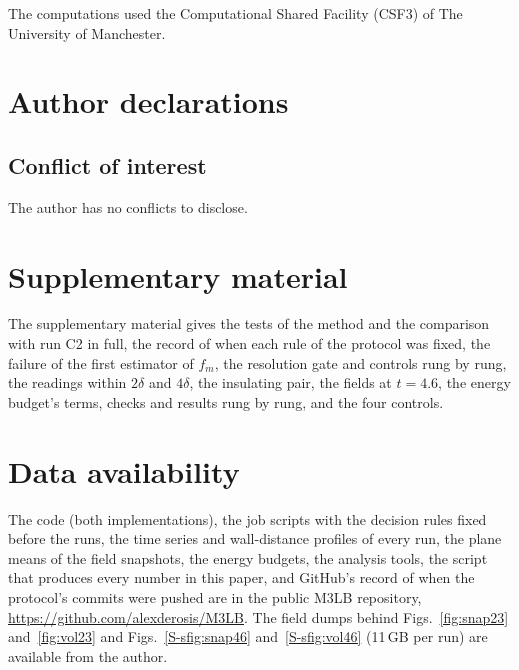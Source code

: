 \documentclass[aip,pop,reprint,amsmath,amssymb,superscriptaddress,floatfix]{revtex4-2}
\begin{document}
\begin{acknowledgments}
The computations used the Computational Shared Facility (CSF3) of The University of
Manchester.
\end{acknowledgments}

\section*{Author declarations}
\subsection*{Conflict of interest}
The author has no conflicts to disclose.

\section*{Supplementary material}
The supplementary material gives the tests of the method and the comparison with
run C2 in full, the record of when each rule of the protocol was fixed, the failure of
the first estimator of $f_m$, the resolution gate and controls rung by rung, the
readings within $2\delta$ and $4\delta$, the insulating pair, the fields at
$t=4.6$, the energy budget's terms, checks and results rung by rung, and the four
controls.

\section*{Data availability}
The code (both implementations), the job scripts with the decision rules fixed before
the runs, the time series and wall-distance profiles of every run, the plane means of
the field snapshots, the energy budgets, the analysis tools, the script that
produces every number in this paper, and GitHub's record of when the protocol's
commits were pushed are in the
public M3LB repository, \url{https://github.com/alexderosis/M3LB}. The field dumps
behind Figs.~\ref{fig:snap23} and~\ref{fig:vol23} and Figs.~\ref{S-sfig:snap46}
and~\ref{S-sfig:vol46} (11\,GB per run) are available from the author.


\end{document}
